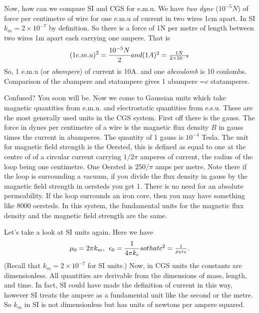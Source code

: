 \documentclass[12pt]{article}
\begin{document}
Now, how can we compare SI and CGS for e.m.u. We have {\it two dyne} ($10^{-5}N$)
 of force per centimetre of wire for one e.m.u of current in two wires 1cm apart. In SI $k_m=2 \times 10^{-7}$ by definition. So there is a  force of 1N 
 per metre of length  between two wires 1m apart each carrying one ampere.
That is
\begin{equation}
(1 e.m.u)^2 = \frac{10^{-5} N}{2}
$$ and   $$
(1 A)^2 = \frac{1 N}{2 \times 10^{-7}}
\end{equation}
So, 1 e.m.u (or {\it abampere}) of current is 10A. and one {\it abcoulomb}
is 10 coulombs. Comparison of the abampere and statampere gives 1 abampere =$c$ statamperes.

Confused? You soon will be. Now we come to Gaussian units which take magnetic
quantities from e.m.u. and electrostatic quantities from e.s.u. These are the most generally used units in the CGS system.
 First off
there is the gauss. The force in dynes per centimetre of a wire
is the magnetic flux density $B$ in gauss times the current in abamperes. The quantity of 1 gauss is $10^{-4}$ Tesla. The unit for magnetic field strength is the Oersted, this is defined as equal to one at the centre of of a circular current carrying $1/2 \pi$ amperes of current, the radius of the loop being one centimetre.
One Oersted is $250/\pi$ amps  per metre. Note there if the loop is surrounding a vacuum, if you divide the flux density in gauss by the magnetic field 
strength in oersteds you get 1. There is no need for an absolute permeability.
If the loop surrounds an iron core, then you may have something like 8000 oersteds. In this system, the fundamental units for the magnetic flux density and the magnetic field strength are the same.

Let's take a look at SI units again. Here we have
\begin{equation}
\mu_0=2 \pi k_m,  \> \> \epsilon_0=\frac{1}{4 \pi k_e}
$$ so that  $$
c^2=\frac{1}{\mu_0 \epsilon_0}.
\end{equation}
(Recall that $k_m=2 \times 10^{-7}$ for SI units.) Now, in CGS units the constants are dimensionless. All quantities are derivable from the dimensions of mass, length, and time. In fact, SI could have made the definition of current in this way, however SI treats the ampere as a fundamental unit like the second or the metre. So $k_m$ in SI is not dimensionless but has units of newtons per ampere squared.
\end{document}
